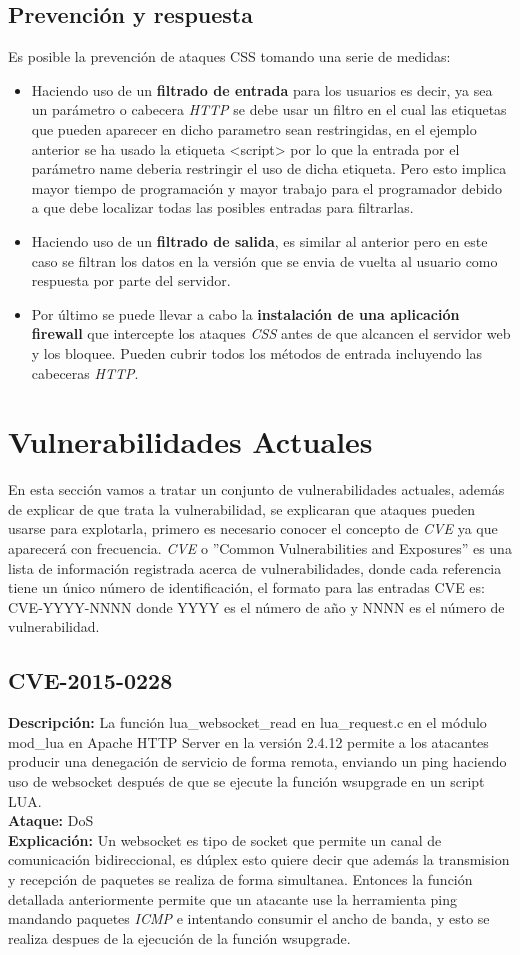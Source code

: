 \documentclass[a4paper, 10pt]{article} %
\begin{document}
\subsection{Prevención y respuesta}
Es posible la prevención de ataques CSS tomando una serie de medidas:
\begin{itemize}
\item Haciendo uso de un \textbf{filtrado de entrada} para los usuarios es decir, ya sea un parámetro o cabecera \textit{HTTP} se debe usar un filtro en el cual las etiquetas que pueden aparecer en dicho parametro sean restringidas, en el ejemplo anterior se ha usado la etiqueta <script> por lo que la entrada por el parámetro name deberia restringir el uso de dicha etiqueta. Pero esto implica mayor tiempo de programación y mayor trabajo para el programador debido a que debe localizar todas las posibles entradas para filtrarlas.
\item Haciendo uso de un \textbf{filtrado de salida}, es similar al anterior pero en este caso se filtran los datos en la versión que se envia de vuelta al usuario como respuesta por parte del servidor.
\item Por último se puede llevar a cabo la \textbf{instalación de una aplicación firewall} que intercepte los ataques \textit{CSS} antes de que alcancen el servidor web y los bloquee.  Pueden cubrir todos los métodos de entrada incluyendo las cabeceras \textit{HTTP}.
\end{itemize}
\section{Vulnerabilidades Actuales}
En esta sección vamos a tratar un conjunto de vulnerabilidades actuales, además de explicar de que trata la vulnerabilidad, se explicaran que ataques pueden usarse para explotarla, primero es necesario conocer el concepto de \textit{CVE} ya que aparecerá con frecuencia. \cite{6} \textit{CVE} o ''Common Vulnerabilities and Exposures'' es una lista de información registrada acerca de vulnerabilidades, donde cada referencia tiene un único número de identificación, el formato para las entradas CVE es: CVE-YYYY-NNNN donde YYYY es el número de año y NNNN es el número de vulnerabilidad.
\subsection{CVE-2015-0228}	
\textbf{Descripción:} La función lua\_websocket\_read en lua\_request.c en el módulo mod\_lua en Apache HTTP Server en la versión 2.4.12 permite a los atacantes producir una denegación de servicio de forma remota, enviando un ping haciendo uso de websocket después de que se ejecute la función wsupgrade en un script LUA.\\
\textbf{Ataque:} DoS\\
\textbf{Explicación:} \cite{11} Un websocket es tipo de socket que permite un canal de comunicación bidireccional, es \cite{10} dúplex esto quiere decir que además la transmision y recepción de paquetes se realiza de forma simultanea. Entonces la función detallada anteriormente permite que un atacante use la herramienta ping mandando paquetes \textit{ICMP} e intentando consumir el ancho de banda, y esto se realiza despues de la ejecución de la función wsupgrade.
\end{document}

